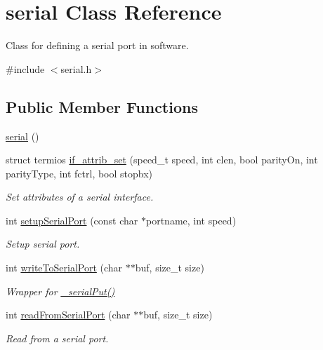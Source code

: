 \hypertarget{classserial}{}\section{serial Class Reference}
\label{classserial}


Class for defining a serial port in software.  




{\ttfamily \#include $<$serial.\+h$>$}

\subsection*{Public Member Functions}
\begin{DoxyCompactItemize}
\item 
\mbox{\hyperlink{classserial_af83de4f3ce9a1973df8c4d93358d6d2d}{serial}} ()
\item 
struct termios \mbox{\hyperlink{classserial_a51a3e798aa1bb4c2c50a34308b47b4fc}{if\+\_\+attrib\+\_\+set}} (speed\+\_\+t speed, int clen, bool parity\+On, int parity\+Type, int fctrl, bool stopbx)
\begin{DoxyCompactList}\small\item\em Set attributes of a serial interface. \end{DoxyCompactList}\item 
int \mbox{\hyperlink{classserial_a0490dba2c7616a997ca6db6903f6865a}{setup\+Serial\+Port}} (const char $\ast$portname, int speed)
\begin{DoxyCompactList}\small\item\em Setup serial port. \end{DoxyCompactList}\item 
int \mbox{\hyperlink{classserial_af9701c5cbb3402a67291c07d57b3d535}{write\+To\+Serial\+Port}} (char $\ast$$\ast$buf, size\+\_\+t size)
\begin{DoxyCompactList}\small\item\em Wrapper for \mbox{\hyperlink{classserial_a4c9d6896cfd99ee1f521bbba7a35cac7}{\+\_\+serial\+Put()}} \end{DoxyCompactList}\item 
int \mbox{\hyperlink{classserial_a0b1ac3334e65f7cb45379aa764c983bf}{read\+From\+Serial\+Port}} (char $\ast$$\ast$buf, size\+\_\+t size)
\begin{DoxyCompactList}\small\item\em Read from a serial port. \end{DoxyCompactList}\end{DoxyCompactItemize}

